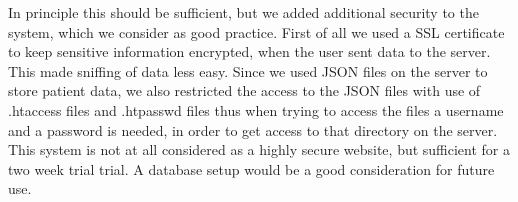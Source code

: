 In principle this should be sufficient, but we added additional security to the system, which we consider as good practice. First of all we used a SSL certificate to keep sensitive information encrypted, when the user sent data to the server. This made sniffing of data less easy. Since we used JSON files on the server to store patient data, we also restricted the access to the JSON files with use of .htaccess files and .htpasswd files thus when trying to access the files a username and a password is needed, in order to get access to that directory on the server. This system is not at all considered as a highly secure website, but sufficient for a two week trial trial. A database setup would be a good consideration for future use.